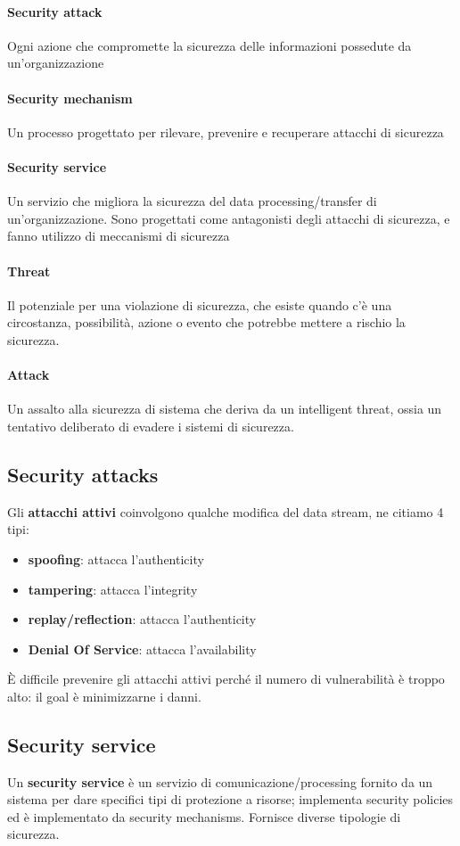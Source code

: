 \documentclass[11pt]{article}
\begin{document}
\paragraph{Security attack} Ogni azione che compromette la sicurezza delle informazioni possedute da un'organizzazione
\paragraph{Security mechanism} Un processo progettato per rilevare, prevenire e recuperare attacchi di sicurezza
\paragraph{Security service} Un servizio che migliora la sicurezza del data processing/transfer di un'organizzazione. Sono progettati come antagonisti degli attacchi di sicurezza, e fanno utilizzo di meccanismi di sicurezza
\paragraph{Threat} Il potenziale per una violazione di sicurezza, che esiste quando c'è una circostanza, possibilità, azione o evento che potrebbe mettere a rischio la sicurezza.
\paragraph{Attack} Un assalto alla sicurezza di sistema che deriva da un intelligent threat, ossia un tentativo deliberato di evadere i sistemi di sicurezza.
\subsection{Security attacks}
Gli \textbf{attacchi attivi} coinvolgono qualche modifica del data stream, ne citiamo 4 tipi:
\begin{itemize}
    \item \textbf{spoofing}: attacca l'authenticity
    \item \textbf{tampering}: attacca l'integrity 
    \item \textbf{replay/reflection}: attacca l'authenticity
    \item \textbf{Denial Of Service}: attacca l'availability
\end{itemize}
È difficile prevenire gli attacchi attivi perché il numero di vulnerabilità è troppo alto: il goal è minimizzarne i danni. 
\subsection{Security service}
Un \textbf{security service} è un servizio di comunicazione/processing fornito da un sistema per dare specifici tipi di protezione a risorse; implementa security policies ed è implementato da security mechanisms. Fornisce diverse tipologie di sicurezza.
\end{document}
